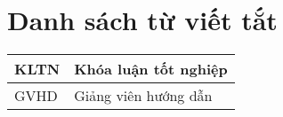 \chapter*{\centering\Large{Danh sách từ viết tắt}}
\begin{tabular}{| p{} |p{} |}
\hline
        KLTN &  Khóa luận tốt nghiệp\\
        \hline
        GVHD & Giảng viên hướng dẫn \\
        \hline
\end{tabular} \\


